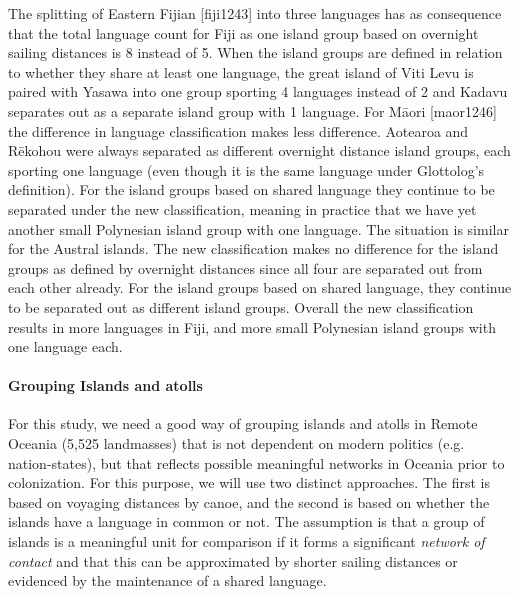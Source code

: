 \documentclass[unnumsec,webpdf,modern,medium]{oup-authoring-template}
\begin{document}
The splitting of Eastern Fijian [fiji1243] into three languages has as consequence that the total language count for Fiji as one island group based on overnight sailing distances is 8 instead of 5. When the island groups are defined in relation to whether they share at least one language, the great island of Viti Levu is paired with Yasawa into one group sporting 4 languages instead of 2 and Kadavu separates out as a separate island group with 1 language. For M\={a}ori [maor1246] the difference in language classification makes less difference. Aotearoa and  R\={e}kohou were always separated as different overnight distance island groups, each sporting one language (even though it is the same language under Glottolog's definition). For the island groups based on shared language they continue to be separated under the new classification, meaning in practice that we have yet another small Polynesian island group with one language. The situation is similar for the Austral islands. The new classification makes no difference for the island groups as defined by overnight distances since all four are separated out from each other already. For the island groups based on shared language, they continue to be separated out as different island groups. Overall the new classification results in more languages in Fiji, and more small Polynesian island groups with one language each.


\FloatBarrier
\paragraph{Grouping Islands and atolls}
\label{appendix_sec:island_geo}


For this study, we need a good way of grouping islands and atolls in Remote Oceania (5,525 landmasses) that is not dependent on modern politics (e.g. nation-states), but that reflects possible meaningful networks in Oceania prior to colonization. For this purpose, we will use two distinct approaches. The first is based on voyaging distances by canoe, and the second is based on whether the islands have a language in common or not. The assumption is that a group of islands is a meaningful unit for comparison if it forms a significant \textit{network of contact} and that this can be approximated by shorter sailing distances or evidenced by the maintenance of a shared language. 
\end{document}
